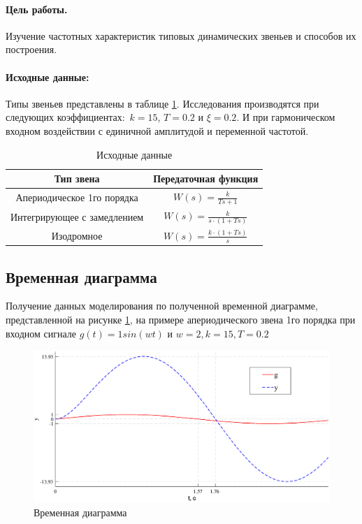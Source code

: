 \documentclass[a4paper,12pt]{article}
\renewcommand{\arraystretch}{1.5}
\renewcommand{\figurename}{Рисунок}
\begin{document}
	
	\paragraph{Цель работы.} 	Изучение частотных характеристик типовых динамических звеньев и способов их построения. 
	\paragraph {Исходные данные:} Типы звеньев представлены в таблице \ref{t_1}. Исследования производятся при следующих коэффициентах:~$k=15$, $T=0.2$ и $\xi=0.2$.  И при гармоническом входном воздействии с единичной амплитудой и переменной частотой.
	\begin{table}[h]
		\centering
		\caption{Исходные данные}
		\renewcommand{\arraystretch}{2} 
		\renewcommand{\tabcolsep}{1.6cm}
		\begin{threeparttable}
		
		
			\begin{tabular}{|c|c|}
				
				\hline
				Тип звена & Передаточная функция \\ \hline
				Апериодическое 1го порядка & $\displaystyle W(s)=\frac{k}{Ts+1}$ \\ \hline
				Интегрирующее с замедлением & $\displaystyle W(s)=\frac{k}{s\cdot (1+Ts)}$ \\ \hline
				Изодромное & $\displaystyle W(s)=\frac{k\cdot (1+Ts)}{s}$ \\ \hline
			
		\end{tabular}
		\end{threeparttable}
		\label{t_1}
	\end{table}
	
	
	\newpage
	\begin{center}
		\section{Временная диаграмма}
	\end{center}
	\par
	Получение данных моделирования по полученной временной диаграмме, представленной на рисунке \ref{prim}, на примере апериодического звена 1го порядка при входном сигнале $g(t)=1sin(wt)$ и $w=2,k=15, T=0.2$
	\begin{figure}[h!]
		\renewcommand{\figurename}{Рисунок}
		\centering
		\includegraphics[width=6in]{prim.eps}
		\caption{Временная диаграмма}
		\label{prim}
	\end{figure}\\
\end{document}

